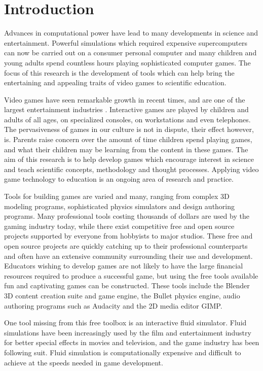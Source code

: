\chapter{Introduction}

Advances in computational power have lead to many developments in science and
entertainment. Powerful simulations which required expensive supercomputers can
now be carried out on a consumer personal computer and many children and young
adults spend countless hours playing sophisticated computer games. The focus of
this research is the development of tools which can help bring the entertaining
and appealing traits of video games to scientific education.


Video games have seen remarkable growth in recent times, and are one of the
largest entertainment industries \cite{needed}. Interactive games are played by
children and adults of all ages, on specialized consoles, on workstations and
even telephones. The pervasiveness of games in our culture is not in dispute,
their effect however, is.\cite{needed} Parents raise concern over the amount of time
children spend playing games, and what their children may be learning from the
content in these games. The aim of this research is to help develop games which
encourage interest in science and teach scientific concepts, methodology and
thought processes. Applying video game technology to education is an ongoing
area of research and practice\cite{needed}. 


Tools for building games are varied and many, ranging from complex 3D modeling
programs, sophisticated physics simulators and design authoring programs. Many
professional tools costing thousands of dollars are used by the gaming industry
today, while there exist competitive free and open source projects supported by
everyone from hobbyists to major studios. These free and open source projects
are quickly catching up to their professional counterparts and often have an
extensive community surrounding their use and development. Educators wishing to
develop games are not likely to have the large financial resources required to
produce a successful game, but using the free tools available fun and
captivating games can be constructed. These tools include the Blender 3D
content creation suite and game engine, the Bullet physics engine, audio
authoring programs such as Audacity and the 2D media editor GIMP. 


One tool missing from this free toolbox is an interactive fluid simulator.
Fluid simulations have been increasingly used by the film and entertainment
industry for better special effects in movies and television, and the game
industry has been following suit. Fluid simulation is computationally expensive
and difficult to achieve at the speeds needed in game development. 

